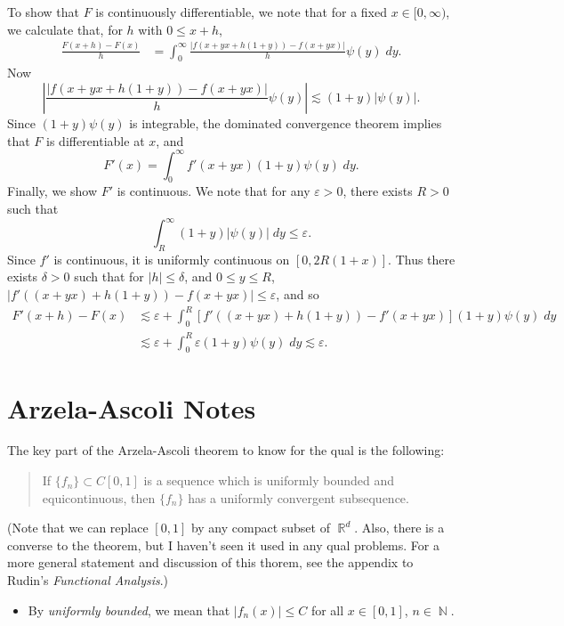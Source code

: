 \documentclass[answers]{exam}
\DeclareMathOperator{\RR}{\mathbb{R}}
\DeclareMathOperator{\NN}{\mathbb{N}}
\begin{document}
\begin{questions}
\begin{solution}
    To show that $F$ is continuously differentiable, we note that for a fixed $x \in [0,\infty)$, we calculate that, for $h$ with $0 \leq x + h$,
    \begin{align*}
        \frac{F(x+h) - F(x)}{h} &= \int_0^\infty \frac{|f(x+yx + h(1 + y)) - f(x + yx)|}{h} \psi(y)\; dy.
    \end{align*}
    Now
    \[ \left| \frac{|f(x+yx + h(1 + y)) - f(x + yx)|}{h} \psi(y) \right| \lesssim (1 + y) |\psi(y)|. \]
    Since $(1 + y) \psi(y)$ is integrable, the dominated convergence theorem implies that $F$ is differentiable at $x$, and
    \[ F'(x) = \int_0^\infty f'(x + yx) (1 + y) \psi(y)\; dy. \]
    Finally, we show $F'$ is continuous. We note that for any $\varepsilon > 0$, there exists $R > 0$ such that
    \[ \int_R^\infty (1 + y) |\psi(y)|\; dy \leq \varepsilon. \]
    Since $f'$ is continuous, it is uniformly continuous on $[0,2R(1 + x)]$. Thus there exists $\delta > 0$ such that for $|h| \leq \delta$, and $0 \leq y \leq R$, $|f'((x + yx) + h(1 + y)) - f(x + yx)| \leq \varepsilon$, and so
    \begin{align*}
        F'(x+h) - F(x) &\lesssim \varepsilon + \int_0^R [f'((x + yx) + h(1 + y)) - f'(x + yx)] (1 + y) \psi(y)\; dy\\
        &\lesssim \varepsilon + \int_0^R \varepsilon (1 + y) \psi(y)\; dy \lesssim \varepsilon.
    \end{align*}
\end{solution}




\newpage
\section{Arzela-Ascoli Notes}

The key part of the Arzela-Ascoli theorem to know for the qual is the following: 

\begin{quote}
If $\{f_n\}\subset C[0,1]$ is a sequence which is uniformly bounded and equicontinuous, then $\{f_n\}$ has a uniformly convergent subsequence.
\end{quote} 

(Note that we can replace $[0,1]$ by any compact subset of $\RR^d$. Also, there is a converse to the theorem, but I haven't seen it used in any qual problems. For a more general statement and discussion of this thorem, see the appendix to Rudin's \textit{Functional Analysis}.)
\begin{itemize}
\item By \textit{uniformly bounded}, we mean that $|f_n(x)|\leq C$ for all $x\in [0,1]$, $n\in \NN$.


\end{itemize}
\end{questions}
\end{document}
